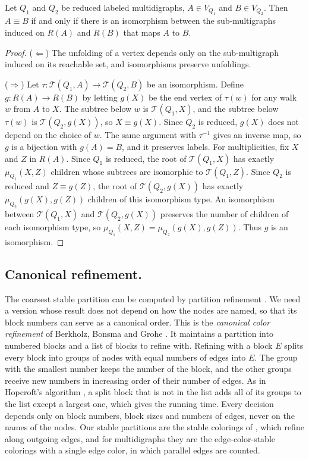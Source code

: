\documentclass[twoside,leqno]{article}
\newcommand{\Unf}{\mathcal{T}}
\newcommand{\Reach}{R}
\begin{document}
\begin{lemma}
\label{lem:reduced-iso}
Let $Q_1$ and $Q_2$ be reduced labeled multidigraphs, $A\in V_{Q_1}$ and $B\in V_{Q_2}$. Then $A\equiv B$ if and only if there is an isomorphism between the sub-multigraphs induced on $\Reach(A)$ and $\Reach(B)$ that maps $A$ to $B$.
\end{lemma}
\begin{proof}
($\Leftarrow$) The unfolding of a vertex depends only on the sub-multigraph induced on its reachable set, and isomorphisms preserve unfoldings.

($\Rightarrow$) Let $\tau:\Unf(Q_1,A)\to\Unf(Q_2,B)$ be an isomorphism. Define $g:\Reach(A)\to\Reach(B)$ by letting $g(X)$ be the end vertex of $\tau(w)$ for any walk $w$ from $A$ to $X$. The subtree below $w$ is $\Unf(Q_1,X)$, and the subtree below $\tau(w)$ is $\Unf(Q_2,g(X))$, so $X\equiv g(X)$. Since $Q_2$ is reduced, $g(X)$ does not depend on the choice of $w$. The same argument with $\tau^{-1}$ gives an inverse map, so $g$ is a bijection with $g(A)=B$, and it preserves labels. For multiplicities, fix $X$ and $Z$ in $\Reach(A)$. Since $Q_1$ is reduced, the root of $\Unf(Q_1,X)$ has exactly $\mu_{Q_1}(X,Z)$ children whose subtrees are isomorphic to $\Unf(Q_1,Z)$. Since $Q_2$ is reduced and $Z\equiv g(Z)$, the root of $\Unf(Q_2,g(X))$ has exactly $\mu_{Q_2}(g(X),g(Z))$ children of this isomorphism type. An isomorphism between $\Unf(Q_1,X)$ and $\Unf(Q_2,g(X))$ preserves the number of children of each isomorphism type, so $\mu_{Q_1}(X,Z)=\mu_{Q_2}(g(X),g(Z))$. Thus $g$ is an isomorphism.
\end{proof}

\subsection{Canonical refinement.}
\label{sec:canonical-refinement}
The coarsest stable partition can be computed by partition refinement \cite{cardon1982partitioning,paige1987three}. We need a version whose result does not depend on how the nodes are named, so that its block numbers can serve as a canonical order. This is the \emph{canonical color refinement} of Berkholz, Bonsma and Grohe \cite{berkholz2017tight}. It maintains a partition into numbered blocks and a list of blocks to refine with. Refining with a block $E$ splits every block into groups of nodes with equal numbers of edges into $E$. The group with the smallest number keeps the number of the block, and the other groups receive new numbers in increasing order of their number of edges. As in Hopcroft's algorithm \cite{hopcraft}, a split block that is not in the list adds all of its groups to the list except a largest one, which gives the running time. Every decision depends only on block numbers, block sizes and numbers of edges, never on the names of the nodes. Our stable partitions are the stable colorings of \cite{berkholz2017tight}, which refine along outgoing edges, and for multidigraphs they are the edge-color-stable colorings with a single edge color, in which parallel edges are counted.
\end{document}
